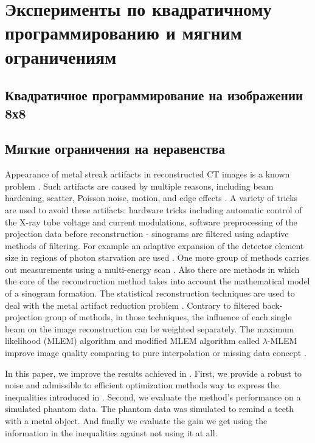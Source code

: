 \chapter{Эксперименты по квадратичному программированию и мягним ограничениям} \label{chapt2}

\section{Квадратичное программирование на изображении 8х8} \label{sect_2_1}


\section{Мягкие ограничения на неравенства} \label{sect_2_2}

Appearance of metal streak artifacts in reconstructed CT images is a known problem \cite{barrett2004artifacts, boas2012ct, nasirudin2015reduction,
park2015computed}. Such artifacts are caused by multiple reasons, including beam hardening, scatter, Poisson noise, motion, and edge effects \cite{boas2012ct}. A variety of tricks are used to avoid these artifacts: hardware tricks including automatic control of the X-ray tube voltage and current modulations, software preprocessing of the projection data before reconstruction - sinograms are filtered using adaptive methods of filtering. For example an adaptive expansion of the detector element size in regions of photon starvation are used \cite{boas2012ct}. One more group of methods carries out measurements using a multi-energy scan \cite{bamberg2011metal}. Also there are methods in which
the core of the reconstruction method takes into account the
mathematical model of a sinogram formation. The statistical reconstruction techniques are used to deal with the metal artifact reduction problem \cite{jmuller2006, buzug2008computed}. Contrary to filtered back-projection group of methods, in those techniques, the influence of each single beam on the image reconstruction can be weighted separately. The maximum likelihood
(MLEM) algorithm \cite{buzug2008computed} and modified MLEM algorithm called $\lambda$-MLEM \cite{oehler2007statistical} improve image quality comparing to pure interpolation or missing data concept \cite{amirkhanov2012evaluation}.

In this paper, we improve the results achieved in \cite{chukalinaway}. First, we provide a robust to noise and admissible to efficient optimization methods way to express the inequalities introduced in \cite{chukalinaway}. Second, we evaluate the method's performance on a simulated phantom data. The phantom data was simulated to remind a teeth with a metal object. And finally we evaluate the gain we get using the information in the inequalities against not using it at all.

